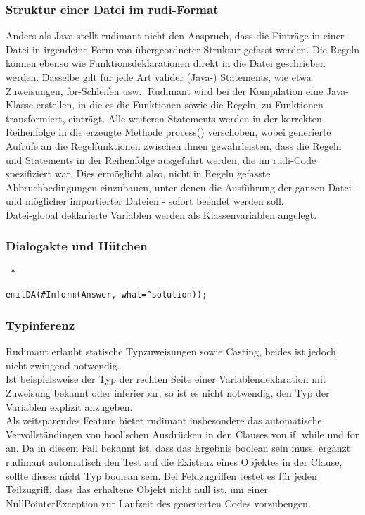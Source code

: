 
\subsubsection{Struktur einer Datei im rudi-Format}

Anders als Java stellt rudimant nicht den Anspruch, dass die Einträge in einer Datei in irgendeine Form von übergeordneter Struktur gefasst werden. Die Regeln können ebenso wie Funktionsdeklarationen direkt in die Datei geschrieben werden. Dasselbe gilt für jede Art valider (Java-) Statements, wie etwa Zuweisungen, for-Schleifen usw.. Rudimant wird bei der Kompilation eine Java-Klasse erstellen, in die es die Funktionen sowie die Regeln, zu Funktionen transformiert, einträgt. Alle weiteren Statements werden in der korrekten Reihenfolge in die erzeugte Methode process() verschoben, wobei generierte Aufrufe an die Regelfunktionen zwischen ihnen gewährleisten, dass die Regeln und Statements in der Reihenfolge ausgeführt werden, die im rudi-Code spezifiziert war. Dies ermöglicht also, nicht in Regeln gefasste Abbruchbedingungen einzubauen, unter denen die Ausführung der ganzen Datei - und möglicher importierter Dateien - sofort beendet werden soll.\\
Datei-global deklarierte Variablen werden als Klassenvariablen angelegt.

\subsubsection{Dialogakte und Hütchen} \ {\Large\verb|^|}

\begin{small}
\begin{verbatim}
emitDA(#Inform(Answer, what=^solution));
\end{verbatim}
\end{small}

\subsubsection{Typinferenz} \label{rudimant-Typinferenz}

Rudimant erlaubt statische Typzuweisungen sowie Casting, beides ist jedoch nicht zwingend notwendig.\\
Ist beispielsweise der Typ der rechten Seite einer Variablendeklaration mit Zuweisung bekannt oder inferierbar, so ist es nicht notwendig, den Typ der Variablen explizit anzugeben.\\
Als zeitsparendes Feature bietet rudimant insbesondere das automatische Vervollständingen von bool'schen Ausdrücken in den Clauses von if, while und for an. Da in diesem Fall bekannt ist, dass das Ergebnis boolean sein muss, ergänzt rudimant automatisch den Test auf die Existenz eines Objektes in der Clause, sollte dieses nicht Typ boolean sein. Bei Feldzugriffen testet es für jeden Teilzugriff, dass das erhaltene Objekt nicht null ist, um einer NullPointerException zur Laufzeit des generierten Codes vorzubeugen.


